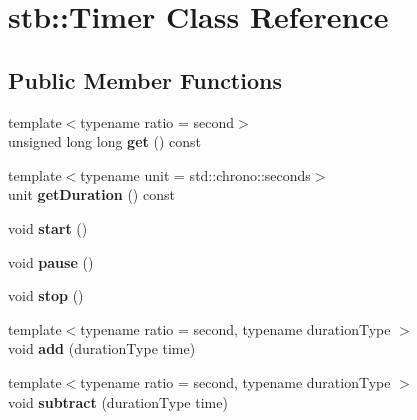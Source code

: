\hypertarget{classstb_1_1Timer}{\section{stb\+:\+:Timer Class Reference}
\label{classstb_1_1Timer}
}
\subsection*{Public Member Functions}
\begin{DoxyCompactItemize}
\item 
\hypertarget{classstb_1_1Timer_a26037b02ded84a9db819cac817760a4f}{{\footnotesize template$<$typename ratio  = second$>$ }\\unsigned long long {\bfseries get} () const }\label{classstb_1_1Timer_a26037b02ded84a9db819cac817760a4f}

\item 
\hypertarget{classstb_1_1Timer_ad167f1cda1a984a51db0988b0be36a5b}{{\footnotesize template$<$typename unit  = std\+::chrono\+::seconds$>$ }\\unit {\bfseries get\+Duration} () const }\label{classstb_1_1Timer_ad167f1cda1a984a51db0988b0be36a5b}

\item 
\hypertarget{classstb_1_1Timer_aeaec01e8e60bb496562d99f8d4d01678}{void {\bfseries start} ()}\label{classstb_1_1Timer_aeaec01e8e60bb496562d99f8d4d01678}

\item 
\hypertarget{classstb_1_1Timer_a93e6e60298c6edd63d4e0708886425bd}{void {\bfseries pause} ()}\label{classstb_1_1Timer_a93e6e60298c6edd63d4e0708886425bd}

\item 
\hypertarget{classstb_1_1Timer_a9f68a8b467843ba53cb502d30ccc66c8}{void {\bfseries stop} ()}\label{classstb_1_1Timer_a9f68a8b467843ba53cb502d30ccc66c8}

\item 
\hypertarget{classstb_1_1Timer_a2e3807d4f91d0dfb04f9e0a78f1ea681}{{\footnotesize template$<$typename ratio  = second, typename duration\+Type $>$ }\\void {\bfseries add} (duration\+Type time)}\label{classstb_1_1Timer_a2e3807d4f91d0dfb04f9e0a78f1ea681}

\item 
\hypertarget{classstb_1_1Timer_ab05c79c7feff035899c7f828567644cc}{{\footnotesize template$<$typename ratio  = second, typename duration\+Type $>$ }\\void {\bfseries subtract} (duration\+Type time)}\label{classstb_1_1Timer_ab05c79c7feff035899c7f828567644cc}


\end{DoxyCompactItemize}
